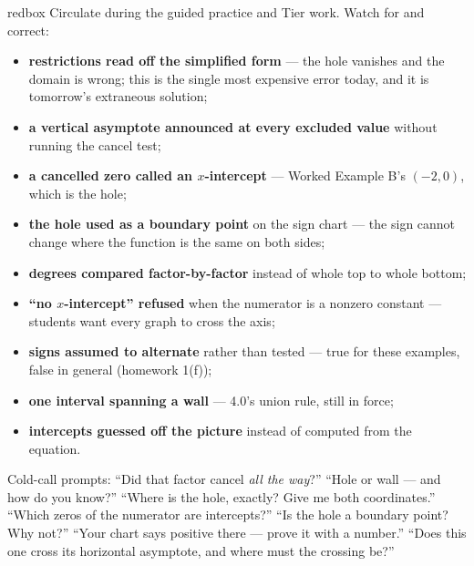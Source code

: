 \documentclass[10pt]{article}
\begin{document}
\begin{skillbox}{redbox}
Circulate during the guided practice and Tier work. Watch for and correct:
\begin{itemize}[leftmargin=1.2em, nosep]
  \item \textbf{restrictions read off the simplified form} --- the hole vanishes and the domain is wrong; this is the single most expensive error today, and it is tomorrow's extraneous solution;
  \item \textbf{a vertical asymptote announced at every excluded value} without running the cancel test;
  \item \textbf{a cancelled zero called an $x$-intercept} --- Worked Example B's $(-2,0)$, which is the hole;
  \item \textbf{the hole used as a boundary point} on the sign chart --- the sign cannot change where the function is the same on both sides;
  \item \textbf{degrees compared factor-by-factor} instead of whole top to whole bottom;
  \item \textbf{``no $x$-intercept'' refused} when the numerator is a nonzero constant --- students want every graph to cross the axis;
  \item \textbf{signs assumed to alternate} rather than tested --- true for these examples, false in general (homework 1(f));
  \item \textbf{one interval spanning a wall} --- 4.0's union rule, still in force;
  \item \textbf{intercepts guessed off the picture} instead of computed from the equation.
\end{itemize}
Cold-call prompts: ``Did that factor cancel \emph{all the way}?'' ``Hole or wall --- and how do you
know?'' ``Where is the hole, exactly? Give me both coordinates.'' ``Which zeros of the numerator are
intercepts?'' ``Is the hole a boundary point? Why not?'' ``Your chart says positive there --- prove it
with a number.'' ``Does this one cross its horizontal asymptote, and where must the crossing be?''
\end{skillbox}
\end{document}
